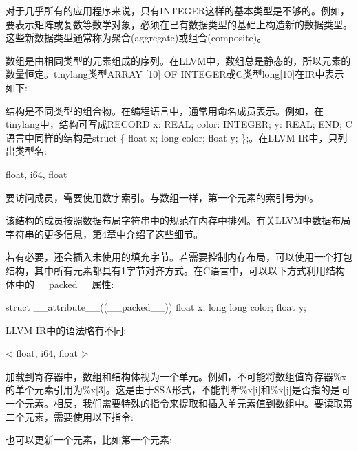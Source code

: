 对于几乎所有的应用程序来说，只有INTEGER这样的基本类型是不够的。例如，要表示矩阵或复数等数学对象，必须在已有数据类型的基础上构造新的数据类型。这些新数据类型通常称为聚合(aggregate)或组合(composite)。

数组是由相同类型的元素组成的序列。在LLVM中，数组总是静态的，所以元素的数量恒定。tinylang类型ARRAY [10] OF INTEGER或C类型long[10]在IR中表示如下:

\begin{shell}
[10 x i64]
\end{shell}

结构是不同类型的组合物。在编程语言中，通常用命名成员表示。例如，在tinylang中，结构可写成RECORD x: REAL;  color: INTEGER;  y: REAL;  END; C语言中同样的结构是struct \{ float x; long color; float y; \};。在LLVM IR中，只列出类型名:

\begin{shell}
{ float, i64, float }
\end{shell}

要访问成员，需要使用数字索引。与数组一样，第一个元素的索引号为0。

该结构的成员按照数据布局字符串中的规范在内存中排列。有关LLVM中数据布局字符串的更多信息，第4章中介绍了这些细节。

若有必要，还会插入未使用的填充字节。若需要控制内存布局，可以使用一个打包结构，其中所有元素都具有1字节对齐方式。在C语言中，可以以下方式利用结构体中的\_\_packed\_\_属性:

\begin{cpp}
struct __attribute__((__packed__)) { float x; long long color; float y; }
\end{cpp}

LLVM IR中的语法略有不同:

\begin{shell}
<{ float, i64, float }>
\end{shell}

加载到寄存器中，数组和结构体视为一个单元。例如，不可能将数组值寄存器\%x的单个元素引用为\%x[3]。这是由于SSA形式，不能判断\%x[i]和\%x[j]是否指的是同一个元素。相反，我们需要特殊的指令来提取和插入单元素值到数组中。要读取第二个元素，需要使用以下指令:

\begin{shell}
\end{shell}

也可以更新一个元素，比如第一个元素:

\begin{shell}
\end{shell}

